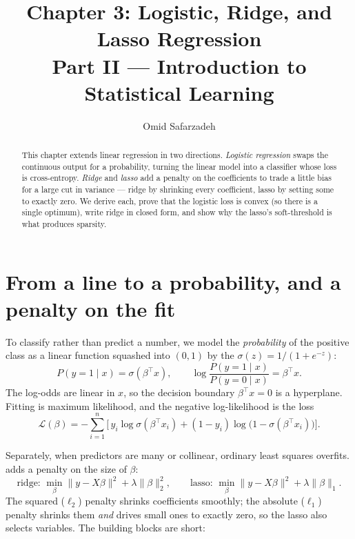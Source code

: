 \documentclass[11pt]{article}
\title{Chapter 3: Logistic, Ridge, and Lasso Regression \\ \large Part II --- Introduction to Statistical Learning}
\author{Omid Safarzadeh}
\date{}
\begin{document}
\maketitle

\begin{abstract}
\noindent
This chapter extends linear regression in two directions. \emph{Logistic
regression} swaps the continuous output for a probability, turning the linear
model into a classifier whose loss is cross-entropy. \emph{Ridge} and
\emph{lasso} add a penalty on the coefficients to trade a little bias for a
large cut in variance --- ridge by shrinking every coefficient, lasso by
setting some to exactly zero. We derive each, prove that the logistic loss is
convex (so there is a single optimum), write ridge in closed form, and show
why the lasso's soft-threshold is what produces sparsity.
\end{abstract}

\tableofcontents

\section{From a line to a probability, and a penalty on the fit}

To classify rather than predict a number, we model the \emph{probability} of
the positive class as a linear function squashed into $(0,1)$ by the
 $\sigma(z) = 1/(1+e^{-z})$:
\[
  P(y=1 \mid x) = \sigma(\beta^\top x), \qquad
  \log\frac{P(y=1\mid x)}{P(y=0\mid x)} = \beta^\top x.
\]
The log-odds are linear in $x$, so the decision boundary
$\beta^\top x = 0$ is a hyperplane. Fitting is maximum likelihood, and the
negative log-likelihood is the  loss
\[
  \mathcal{L}(\beta) = -\sum_{i=1}^n \Big[\,y_i \log \sigma(\beta^\top x_i)
     + (1-y_i)\log\big(1 - \sigma(\beta^\top x_i)\big)\Big].
\]

Separately, when predictors are many or collinear, ordinary least squares
overfits.  adds a penalty on the size of $\beta$:
\[
  \text{ridge: } \min_\beta \|y - X\beta\|^2 + \lambda\|\beta\|_2^2,
  \qquad
  \text{lasso: } \min_\beta \|y - X\beta\|^2 + \lambda\|\beta\|_1.
\]
The squared ($\ell_2$) penalty shrinks coefficients smoothly; the
absolute ($\ell_1$) penalty shrinks them \emph{and} drives small ones to
exactly zero, so the lasso also selects variables. The building blocks are
short:
\end{document}

